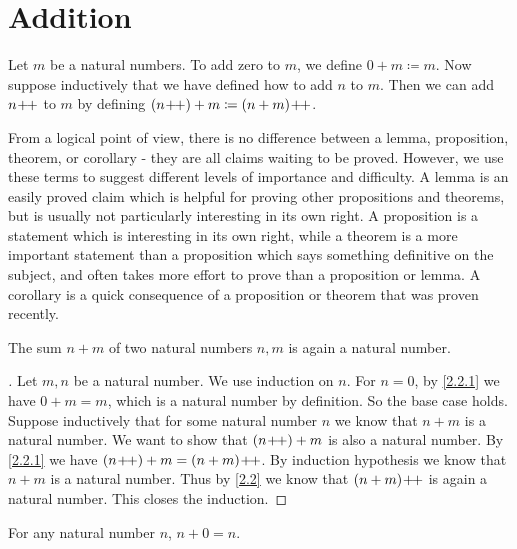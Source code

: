 \section{Addition}\label{sec:2.2}

\begin{defn}\label{2.2.1}
  Let \(m\) be a natural numbers.
  To add zero to \(m\), we define \(0 + m \coloneqq m\).
  Now suppose inductively that we have defined how to add \(n\) to \(m\).
  Then we can add \(n\!+\!\!+\) to \(m\) by defining \((n\!+\!\!+) + m \coloneqq (n + m)\!+\!\!+\).
\end{defn}

\begin{note}
  From a logical point of view, there is no difference between a lemma, proposition, theorem, or corollary
  - they are all claims waiting to be proved.
  However, we use these terms to suggest different levels of importance and difficulty.
  A lemma is an easily proved claim which is helpful for proving other propositions and theorems, but is usually not particularly interesting in its own right.
  A proposition is a statement which is interesting in its own right, while a theorem is a more important statement than a proposition which says something definitive on the subject, and often takes more effort to prove than a proposition or lemma.
  A corollary is a quick consequence of a proposition or theorem that was proven recently.
\end{note}

\begin{ac}\label{ac:2.2.1}
  The sum \(n + m\) of two natural numbers \(n, m\) is again a natural number.
\end{ac}

\begin{proof}[]
  Let \(m, n\) be a natural number.
  We use induction on \(n\).
  For \(n = 0\), by \cref{2.2.1} we have \(0 + m = m\), which is a natural number by definition.
  So the base case holds.
  Suppose inductively that for some natural number \(n\) we know that \(n + m\) is a natural number.
  We want to show that \((n\!+\!\!+) + m\) is also a natural number.
  By \cref{2.2.1} we have \((n\!+\!\!+) + m = (n + m)\!+\!\!+\).
  By induction hypothesis we know that \(n + m\) is a natural number.
  Thus by \cref{2.2} we know that \((n + m)\!+\!\!+\) is again a natural number.
  This closes the induction.
\end{proof}

\begin{lem}\label{2.2.2}
  For any natural number \(n\), \(n + 0 = n\).
\end{lem}

